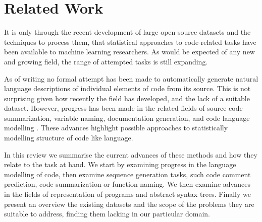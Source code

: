 \chapter{Related Work}

It is only through the recent development of large open source datasets and the techniques to process them, that statistical approaches to code-related tasks have been available to machine learning researchers. 
As would be expected of any new and growing field, the range of attempted tasks is still expanding. 


As of writing no formal attempt has been made to automatically generate natural language descriptions of individual elements of code from its source.  
This is not surprising given how recently the field has developed, and the lack of a suitable dataset.
However, progress has been made in the related fields of source code summarization, variable naming, documentation generation, and code language modelling \citep{allamanis_survey_2017}.  
These advances highlight possible approaches to statistically modelling structure of code like language.  

In this review we summarise the current advances of these methods and how they relate to the task at hand.  We start by examining progress in the language modelling of code, then examine sequence generation tasks, such code comment prediction, code summarization or function naming. We then examine advances in the fields of representation of programs and abstract syntax trees. Finally we present an overview the existing datasets and the scope of the problems they are suitable to address, finding them lacking in our particular domain.



